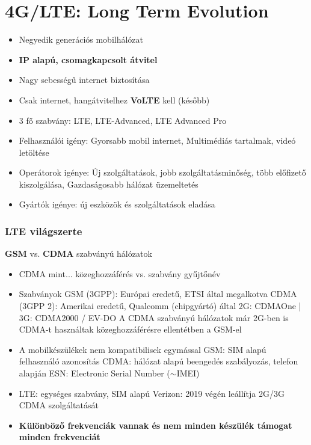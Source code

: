 \documentclass[10pt,a4paper]{article}
\begin{document}
\section{4G/LTE: Long Term Evolution}
\begin{itemize}
	\item Negyedik generációs mobilhálózat
	\item \textbf{IP alapú, csomagkapcsolt átvitel}
	\item Nagy sebességű internet biztosítása
	\item Csak internet, hangátvitelhez \textbf{VoLTE} kell (később)
	\item 3 fő szabvány: LTE, LTE-Advanced, LTE Advanced Pro
	\item  Felhasználói igény: Gyorsabb mobil internet, Multimédiás tartalmak, videó letöltése
	\item Operátorok igénye: Új szolgáltatások, jobb szolgáltatásminőség, több előfizető
	kiszolgálása, Gazdaságosabb hálózat üzemeltetés
	\item  Gyártók igénye: új eszközök és szolgáltatások eladása
\end{itemize}
\subsubsection{LTE világszerte}
\textbf{GSM} vs. \textbf{CDMA} szabványú hálózatok
\begin{itemize}
\item CDMA mint... közeghozzáférés vs. szabvány gyűjtőnév
\item Szabványok
\subitem GSM (3GPP): Európai eredetű, ETSI által megalkotva
\subitem CDMA (3GPP 2): Amerikai eredetű, Qualcomm (chipgyártó) által
\subsubitem 2G: CDMAOne | 3G: CDMA2000 / EV-DO
\subsubitem A CDMA szabványú hálózatok már 2G-ben is CDMA-t használtak
közeghozzáférésre ellentétben a GSM-el
\item A mobilkészülékek nem kompatibilisek egymással
\subitem GSM: SIM alapú felhasználó azonosítás
\subitem CDMA: hálózat alapú beengedés szabályozás, telefon alapján
\subsubitem ESN: Electronic Serial Number ($\sim$IMEI)
\item LTE: egységes szabvány, SIM alapú
\subitem Verizon: 2019 végén leállítja 2G/3G CDMA szolgáltatását
\item \textbf{Különböző frekvenciák vannak és nem minden készülék támogat minden frekvenciát}
\end{itemize}
\end{document}
